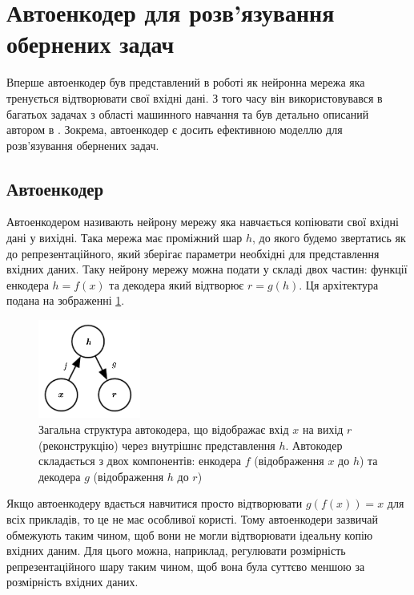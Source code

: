 \documentclass[14pt,a4paper]{extarticle}
\newcounter{e}
\numberwithin{equation}{section}
\numberwithin{figure}{section}
\begin{document}
	\newpage
	\thispagestyle{empty}
	\section{Автоенкодер для розв'язування обернених задач}

	Вперше автоенкодер був представлений в роботі \cite{10.5555/104279} як нейронна мережа яка тренується відтворювати свої вхідні дані. З того часу він використовувався в багатьох задачах з області машинного навчання та був детально описаний автором в \cite{Goodfellow-et-al-2016}. Зокрема, автоенкодер є досить ефективною моделлю для розв'язування обернених задач.
	
	\subsection{Автоенкодер}
	
	Автоенкодером називають нейрону мережу яка навчається копіювати свої вхідні дані у вихідні. Така мережа має проміжний шар $h$, до якого будемо звертатись як до репрезентаційного, який зберігає параметри необхідні для представлення вхідних даних. Таку нейрону мережу можна подати у складі двох частин: функції енкодера $h = f(x)$ та декодера який відтворює $r = g(h)$. Ця архітектура подана на зображенні \ref*{fig:autoencoder-graph}.
	\begin{figure}[H]
		\centering
		\includegraphics[width=0.3\textwidth]{resources/autoencoder-graph.png}
		\caption{Загальна структура автокодера, що відображає вхід $x$ на вихід $r$ (реконструкцію) через внутрішнє представлення $h$. Автокодер складається з двох компонентів: енкодера $f$ (відображення $x$ до $h$) та декодера $g$ (відображення $h$ до $r$) \cite{Goodfellow-et-al-2016}} 
		\label{fig:autoencoder-graph}
	\end{figure}
	Якщо автоенкодеру вдається навчитися просто відтворювати $g(f(x)) = x$ для всіх прикладів, то це не має особливої користі. Тому автоенкодери зазвичай обмежують таким чином, щоб вони не могли відтворювати ідеальну копію вхідних даним. Для цього можна, наприклад, регулювати розмірність репрезентаційного шару таким чином, щоб вона була суттєво меншою за розмірність вхідних даних.
	
\end{document}
